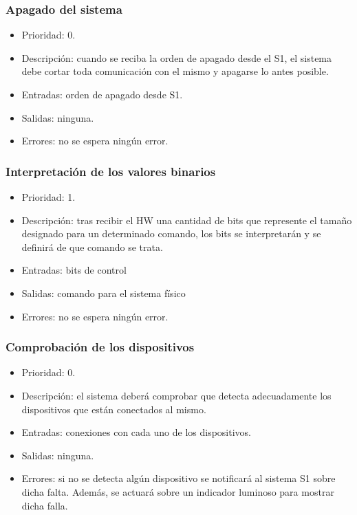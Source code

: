 \subsubsection{Apagado del sistema}
\begin{itemize}
    \item Prioridad: 0.
    \item Descripción: cuando se reciba la orden de apagado desde el \ac{S1}, el sistema debe cortar toda comunicación con el mismo y apagarse lo antes posible.
    \item Entradas: orden de apagado desde \ac{S1}.
    \item Salidas: ninguna.
    \item Errores: no se espera ningún error.
\end{itemize}

\subsubsection{Interpretación de los valores binarios}
\begin{itemize}
    \item Prioridad: 1.
    \item Descripción: tras recibir el \ac{HW} una cantidad de bits que represente el tamaño designado para un determinado comando, los bits se interpretarán y se definirá de que comando se trata.
    \item Entradas: bits de control
    \item Salidas: comando para el sistema físico
    \item Errores: no se espera ningún error.
\end{itemize}

\subsubsection{Comprobación de los dispositivos}
\begin{itemize}
    \item Prioridad: 0.
    \item Descripción: el sistema deberá comprobar que detecta adecuadamente los dispositivos que están conectados al mismo.
    \item Entradas: conexiones con cada uno de los dispositivos.
    \item Salidas: ninguna.
    \item Errores: si no se detecta algún dispositivo se notificará al sistema \ac{S1} sobre dicha falta. Además, se actuará sobre un indicador luminoso para mostrar dicha falla.
\end{itemize}

